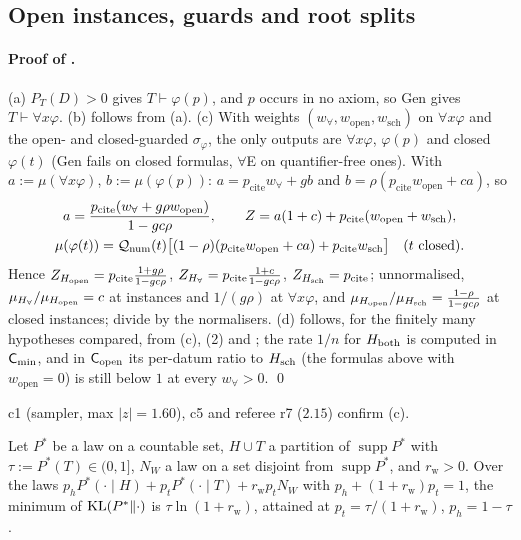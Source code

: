 \subsection{Open instances, guards and root splits}\label{app:univ:open}

\paragraph{Proof of .} (a) $P_T(D)>0$ gives $T\vdash\varphi(p)$, and $p$ occurs in no axiom, so Gen gives $T\vdash\forall x\varphi$. (b) follows from (a). (c) With weights $(w_\forall,w_{\mathrm{open}},w_{\mathrm{sch}})$ on $\forall x\varphi$ and the open- and closed-guarded $\sigma_\varphi$, the only outputs are $\forall x\varphi$, $\varphi(p)$ and closed $\varphi(t)$ (Gen fails on closed formulas, $\forall$E on quantifier-free ones). With $a:=\mu(\forall x\varphi)$, $b:=\mu(\varphi(p))$: $a=p_{\mathrm{cite}}w_\forall+gb$ and $b=\rho(p_{\mathrm{cite}}w_{\mathrm{open}}+ca)$, so
\begin{gather*}
a=\frac{p_{\mathrm{cite}}(w_\forall+g\rho w_{\mathrm{open}})}{1-gc\rho},\qquad Z=a(1+c)+p_{\mathrm{cite}}(w_{\mathrm{open}}+w_{\mathrm{sch}}),\\
\mu(\varphi(t))=\mathcal{Q}_{\mathrm{num}}(t)\big[(1-\rho)(p_{\mathrm{cite}}w_{\mathrm{open}}+ca)+p_{\mathrm{cite}}w_{\mathrm{sch}}\big]\quad(t\text{ closed}).
\end{gather*}
Hence $Z_{H_{\mathrm{open}}}=p_{\mathrm{cite}}\frac{1+g\rho}{1-gc\rho}$, $Z_{H_{\forall}}=p_{\mathrm{cite}}\frac{1+c}{1-gc\rho}$, $Z_{H_{\mathrm{sch}}}=p_{\mathrm{cite}}$; unnormalised, $\mu_{H_{\forall}}/\mu_{H_{\mathrm{open}}}=c$ at instances and $1/(g\rho)$ at $\forall x\varphi$, and $\mu_{H_{\mathrm{open}}}/\mu_{H_{\mathrm{sch}}}=\frac{1-\rho}{1-gc\rho}$ at closed instances; divide by the normalisers. (d) follows, for the finitely many hypotheses compared, from (c), (2) and ; the rate $1/n$ for $H_{\mathrm{both}}$ is computed in $\mathsf{C}_{\min}$, and in $\mathsf{C}_{\mathrm{open}}$ its per-datum ratio to $H_{\mathrm{sch}}$ (the formulas above with $w_{\mathrm{open}}=0$) is still below $1$ at every $w_\forall>0$. \qed

c1 (sampler, max $\lvert z\rvert=1.60$), c5 and referee r7 ($2.15$) confirm (c).

\begin{lemma}[Waste]\label{lem:univ:waste}
Let $P^*$ be a law on a countable set, $H\cup T$ a partition of $\operatorname{supp}P^*$ with $\tau:=P^*(T)\in(0,1]$, $N_W$ a law on a set disjoint from $\operatorname{supp}P^*$, and $r_{\mathrm w}>0$. Over the laws $p_hP^*(\cdot\mid H)+p_tP^*(\cdot\mid T)+r_{\mathrm w}p_tN_W$ with $p_h+(1+r_{\mathrm w})p_t=1$, the minimum of $\mathrm{KL}(P^*\|\cdot)$ is $\tau\ln(1+r_{\mathrm w})$, attained at $p_t=\tau/(1+r_{\mathrm w})$, $p_h=1-\tau$.
\end{lemma}

